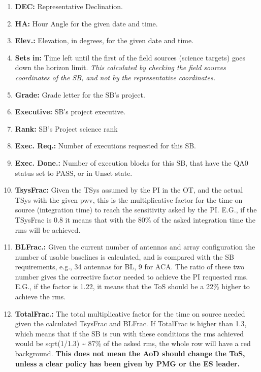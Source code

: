 \documentclass[a4paper,10pt,english]{sphinxmanual}
\begin{document}
\begin{enumerate}
\item {} 
\textbf{DEC:} Representative Declination.

\item {} 
\textbf{HA:} Hour Angle for the given date and time.

\item {} 
\textbf{Elev.:} Elevation, in degrees, for the given date and time.

\item {} 
\textbf{Sets in:} Time left until the first of the field sources (science targets)
goes down the horizon limit. \emph{This calculated by checking the field sources}
\emph{coordinates of the SB, and not by the representative coordinates.}

\item {} 
\textbf{Grade:} Grade letter for the SB's project.

\item {} 
\textbf{Executive:} SB's project executive.

\item {} 
\textbf{Rank:} SB's Project science rank

\item {} 
\textbf{Exec. Req.:} Number of executions requested for this SB.

\item {} 
\textbf{Exec. Done.:} Number of execution blocks for this SB, that have the QA0
status set to PASS, or in Unset state.

\item {} 
\textbf{TsysFrac:} Given the TSys assumed by the PI in the OT, and the actual TSys
with the given pwv, this is the multiplicative factor for the time on source
(integration time) to reach the sensitivity asked by the PI. E.G., if the
TSysFrac is 0.8 it means that with the 80\% of the asked integration time the
rms will be achieved.

\item {} 
\textbf{BLFrac.:} Given the current number of antennas and array configuration the
number of usable baselines is calculated, and is compared with the SB
requirements, e.g., 34 antennas for BL, 9 for ACA. The ratio of these two
number gives the corrective factor needed to achieve the PI requested rms.
E.G., if the factor is 1.22, it means that the ToS should be a 22\% higher to
achieve the rms.

\item {} 
\textbf{TotalFrac.:} The total multiplicative factor for the time on source needed
given the calculated TsysFrac and BLFrac. If TotalFrac is higher than 1.3,
which means that if the SB is run with these conditions the rms achieved
would be sqrt(1/1.3) \textasciitilde{} 87\% of the asked rms, the whole row will have a
red background.
\textbf{This does not mean the AoD should change the ToS, unless}
\textbf{a clear policy has been given by PMG or the ES leader.}


\end{enumerate}
\end{document}
